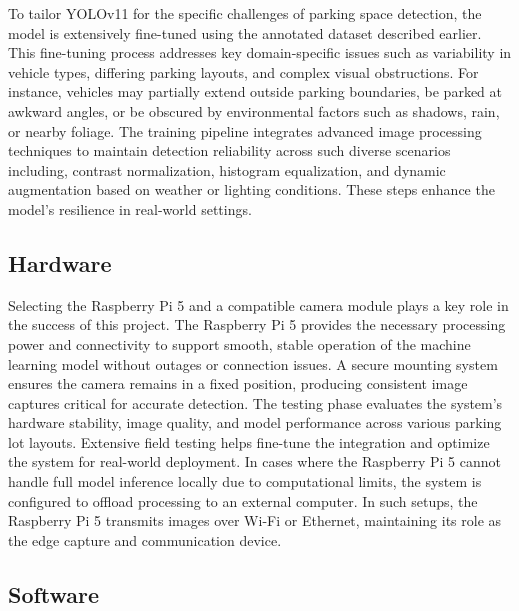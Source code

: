 \documentclass[conference]{IEEEtran}
\begin{document}
To tailor YOLOv11 for the specific challenges of parking space detection, the model is extensively fine-tuned using the annotated dataset \cite{dataset_images}
described earlier. 
This fine-tuning process addresses key domain-specific issues such as variability in vehicle types, 
differing parking layouts, 
and complex visual obstructions. 
For instance, vehicles may partially extend outside parking boundaries, 
be parked at awkward angles, 
or be obscured by environmental factors such as shadows, 
rain, 
or nearby foliage. 
The training pipeline integrates advanced image processing techniques to maintain detection reliability across such diverse scenarios including,
contrast normalization, 
histogram equalization, 
and dynamic augmentation based on weather or lighting conditions. 
These steps enhance the model’s resilience in real-world settings.

\subsection{Hardware}

Selecting the Raspberry Pi 5 and a compatible camera module plays a key role in the success of this project. 
The Raspberry Pi 5 provides the necessary processing power and connectivity to support smooth, 
stable operation of the machine learning model without outages or connection issues. 
A secure mounting system ensures the camera remains in a fixed position, 
producing consistent image captures critical for accurate detection. 
The testing phase evaluates the system’s hardware stability, 
image quality, 
and model performance across various parking lot layouts. 
Extensive field testing helps fine-tune the integration and optimize the system for real-world deployment. 
In cases where the Raspberry Pi 5 cannot handle full model inference locally due to computational limits, 
the system is configured to offload processing to an external computer. 
In such setups, 
the Raspberry Pi 5 transmits images over Wi-Fi or Ethernet, 
maintaining its role as the edge capture and communication device.

\subsection{Software}
\end{document}
